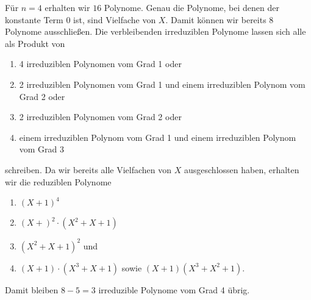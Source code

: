 \documentclass{article}
\begin{document}
    Für $n = 4$ erhalten wir $16$ Polynome. Genau die Polynome, bei denen der konstante Term 0 ist, sind Vielfache von $X$. Damit können wir bereits $8$ Polynome ausschließen. Die verbleibenden irreduziblen Polynome lassen sich alle als Produkt von 
    \begin{enumerate}
        \item 4 irreduziblen Polynomen vom Grad 1 oder 
        \item 2 irreduziblen Polynomen vom Grad 1 und einem irreduziblen Polynom vom Grad 2 oder
        \item 2 irreduziblen Polynomen vom Grad 2 oder
        \item einem irreduziblen Polynom vom Grad 1 und einem irreduziblen Polynom vom Grad 3
    \end{enumerate}
    schreiben.
    Da wir bereits alle Vielfachen von $X$ ausgeschlossen haben, erhalten wir die reduziblen Polynome
    \begin{enumerate}
        \item $(X + 1)^4$
        \item $(X + )^2 \cdot (X^2 + X + 1)$
        \item $(X^2 + X + 1)^2$ und
        \item $(X + 1)\cdot (X^3 + X + 1)$ sowie $(X + 1)(X^3 + X^2 + 1)$.
    \end{enumerate}
    Damit bleiben $8 - 5 = 3$ irreduzible Polynome vom Grad 4 übrig.
\end{document}
